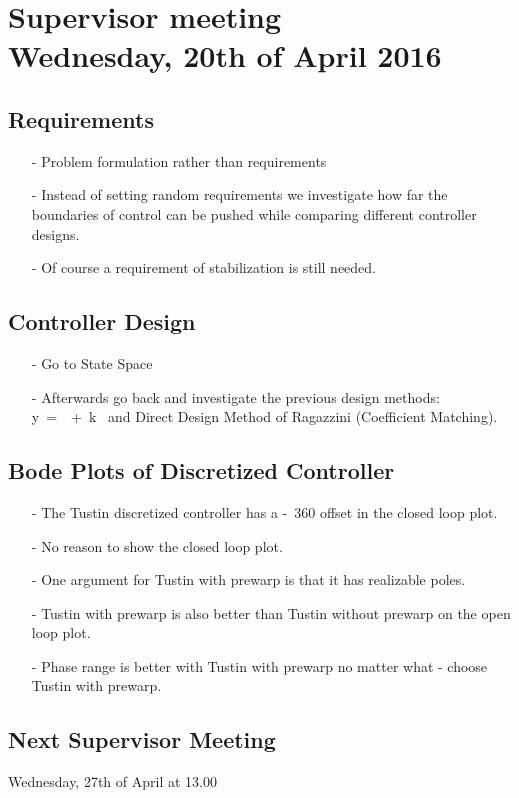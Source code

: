 

\renewcommand\chaptername{KAPITEL}
\renewcommand\contentsname{Indhold}
\renewcommand\figurename{Figur}
\renewcommand\tablename{Tabel}

\section*{Supervisor meeting\\ \small Wednesday, 20th of April 2016}

\subsection{Requirements}
\begin{itemize}
  \item[-] Problem formulation rather than requirements
  \item[-] Instead of setting random requirements we investigate how far the boundaries of control can be pushed while comparing different controller designs.
  \item[-] Of course a requirement of stabilization is still needed.
\end{itemize}

\subsection{Controller Design}
\begin{itemize}
  \item[-] Go to State Space
  \item[-] Afterwards go back and investigate the previous design methods: \si{y = \theta + k \omega} and Direct Design Method of Ragazzini (Coefficient Matching).
\end{itemize}

\subsection{Bode Plots of Discretized Controller}
\begin{itemize}
  \item[-] The Tustin discretized controller has a \si{-360^\circ} offset in the closed loop plot.
  \item[-] No reason to show the closed loop plot.
  \item[-] One argument for Tustin with prewarp is that it has realizable poles.
  \item[-] Tustin with prewarp is also better than Tustin without prewarp on the open loop plot.
  \item[-] Phase range is better with Tustin with prewarp no matter what - choose Tustin with prewarp.
\end{itemize}

\subsection{Next Supervisor Meeting}
Wednesday, 27th of April at 13.00


